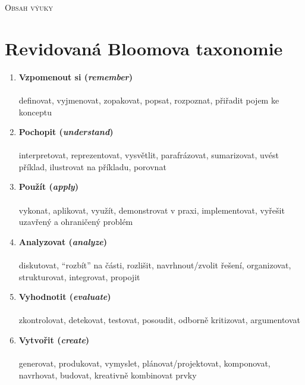 \textsc{Obsah výuky}\\

\newpage

\chapter*{Revidovaná Bloomova taxonomie}
\label{bloom}
\vspace{-0.5em}
\vspace{-0.3em}

\begin{enumerate}[leftmargin=*]
\item \textbf{Vzpomenout si (\textit{remember})}\\
\\
{\small definovat, vyjmenovat, zopakovat, popsat, rozpoznat, přiřadit pojem ke konceptu}

\item \textbf{Pochopit (\textit{understand})}\\
\\
{\small interpretovat, reprezentovat, vysvětlit, parafrázovat, sumarizovat, uvést příklad, ilustrovat na příkladu, porovnat}

\item \textbf{Použít (\textit{apply})}\\
\\
{\small vykonat, aplikovat, využít, demonstrovat v praxi, implementovat, vyřešit uzavřený a ohraničený problém}

\item \textbf{Analyzovat (\textit{analyze})}\\
\\
{\small diskutovat, \enquote{rozbít} na části, rozlišit, navrhnout/zvolit řešení, organizovat, strukturovat, integrovat, propojit}

\item \textbf{Vyhodnotit (\textit{evaluate})}\\
\\
{\small zkontrolovat, detekovat, testovat, posoudit, odborně kritizovat, argumentovat}

\item \textbf{Vytvořit (\textit{create})}\\
\\
{\small generovat, produkovat, vymyslet, plánovat/projektovat, komponovat, navrhovat, budovat, kreativně kombinovat prvky}
\end{enumerate}

